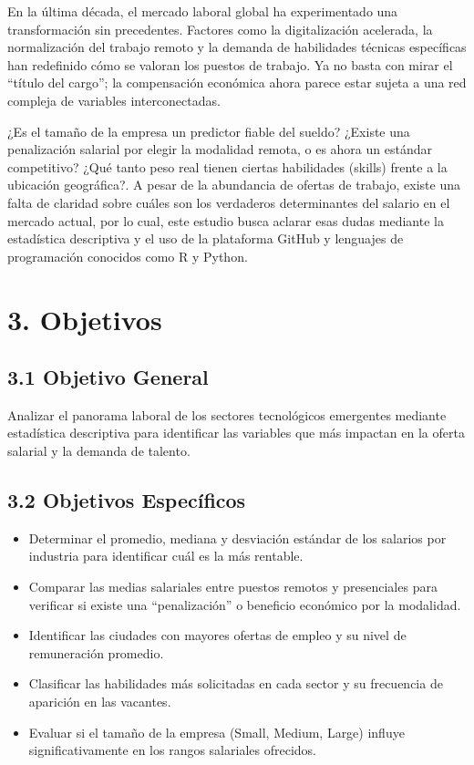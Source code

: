\documentclass[oneside,11pt]{Latex/Classes/PhDthesisPSnPDF}
\begin{document}
En la última década, el mercado laboral global ha experimentado una
transformación sin precedentes. Factores como la digitalización
acelerada, la normalización del trabajo remoto y la demanda de
habilidades técnicas específicas han redefinido cómo se valoran los
puestos de trabajo. Ya no basta con mirar el ``título del cargo''; la
compensación económica ahora parece estar sujeta a una red compleja de
variables interconectadas.

¿Es el tamaño de la empresa un predictor fiable del sueldo? ¿Existe una
penalización salarial por elegir la modalidad remota, o es ahora un
estándar competitivo? ¿Qué tanto peso real tienen ciertas habilidades
(skills) frente a la ubicación geográfica?. A pesar de la abundancia de
ofertas de trabajo, existe una falta de claridad sobre cuáles son los
verdaderos determinantes del salario en el mercado actual, por lo cual,
este estudio busca aclarar esas dudas mediante la estadística
descriptiva y el uso de la plataforma GitHub y lenguajes de programación
conocidos como R y Python.

\section{3. Objetivos}\label{objetivos}

\subsection{3.1 Objetivo General}\label{objetivo-general}

Analizar el panorama laboral de los sectores tecnológicos emergentes
mediante estadística descriptiva para identificar las variables que más
impactan en la oferta salarial y la demanda de talento.

\subsection{3.2 Objetivos Específicos}\label{objetivos-especuxedficos}

\begin{itemize}
\item
  Determinar el promedio, mediana y desviación estándar de los salarios
  por industria para identificar cuál es la más rentable.
\item
  Comparar las medias salariales entre puestos remotos y presenciales
  para verificar si existe una ``penalización'' o beneficio económico
  por la modalidad.
\item
  Identificar las ciudades con mayores ofertas de empleo y su nivel de
  remuneración promedio.
\item
  Clasificar las habilidades más solicitadas en cada sector y su
  frecuencia de aparición en las vacantes.
\item
  Evaluar si el tamaño de la empresa (Small, Medium, Large) influye
  significativamente en los rangos salariales ofrecidos.
\end{itemize}
\end{document}
